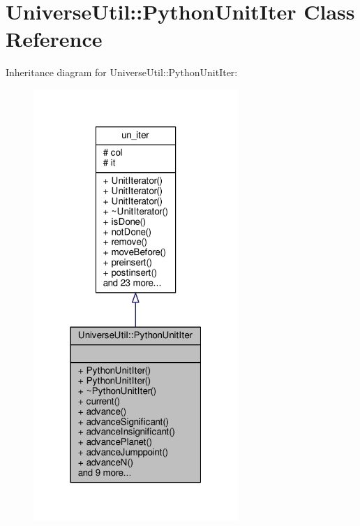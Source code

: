 \hypertarget{classUniverseUtil_1_1PythonUnitIter}{}\section{Universe\+Util\+:\+:Python\+Unit\+Iter Class Reference}
\label{classUniverseUtil_1_1PythonUnitIter}


Inheritance diagram for Universe\+Util\+:\+:Python\+Unit\+Iter\+:
\nopagebreak
\begin{figure}[H]
\begin{center}
\leavevmode
\includegraphics[width=220pt]{d2/d31/classUniverseUtil_1_1PythonUnitIter__inherit__graph}
\end{center}
\end{figure}



